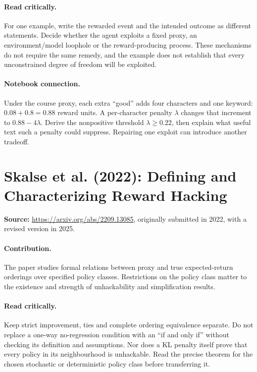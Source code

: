 \documentclass[11pt]{scrartcl}
\begin{document}
\paragraph{Read critically.} For one example, write the rewarded event and the
intended outcome as different statements. Decide whether the agent exploits a
fixed proxy, an environment/model loophole or the reward-producing process.
These mechanisms do not require the same remedy, and the example does not
establish that every unconstrained degree of freedom will be exploited.

\paragraph{Notebook connection.} Under the course proxy, each extra ``good''
adds four characters and one keyword: $0.08+0.8=0.88$ reward units. A per-character
penalty $\lambda$ changes that increment to $0.88-4\lambda$.
Derive the nonpositive threshold $\lambda\ge0.22$, then explain what useful text
such a penalty could suppress. Repairing one exploit can introduce another tradeoff.

\section{Skalse et al. (2022): Defining and Characterizing Reward Hacking}
\textbf{Source:} \url{https://arxiv.org/abs/2209.13085}, originally submitted in 2022,
with a revised version in 2025.

\paragraph{Contribution.} The paper studies formal relations between proxy
and true expected-return orderings over specified policy classes. Restrictions
on the policy class matter to the existence and strength of unhackability
and simplification results.

\paragraph{Read critically.} Keep strict improvement, ties and complete
ordering equivalence separate. Do not replace a one-way no-regression condition
with an ``if and only if'' without checking its definition and assumptions.
Nor does a KL penalty itself prove that every policy in its neighbourhood is
unhackable. Read the precise theorem for the chosen stochastic or deterministic
policy class before transferring it.
\end{document}
